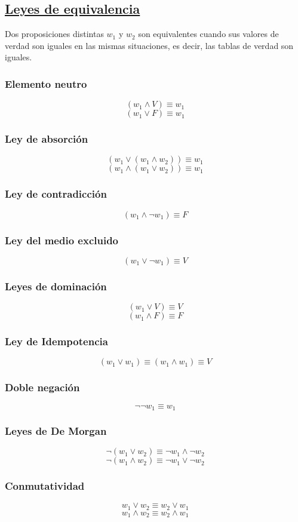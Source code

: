 \documentclass[10pt,a4paper,openright]{book}
\begin{document}
\subsection*{\underline{Leyes de equivalencia}}
Dos proposiciones distintas $w_1$ y $w_2$ son equivalentes cuando sus valores de verdad son iguales en las mismas situaciones, es decir, las tablas de verdad son iguales.

\begin{multicols}{2}
\subsubsection*{Elemento neutro}
$$(w_1 \wedge V) \equiv w_1$$
$$(w_1 \vee F) \equiv w_1$$
\subsubsection*{Ley de absorción}
$$(w_1 \vee (w_1 \wedge w_2 )) \equiv w_1$$
$$(w_1 \wedge (w_1 \vee w_2 )) \equiv w_1$$
\subsubsection*{Ley de contradicción}
$$(w_1 \wedge \neg w_1 ) \equiv F$$
\subsubsection*{Ley del medio excluido}
$$(w_1 \vee \neg w_1) \equiv V$$
\subsubsection*{Leyes de dominación}
$$(w_1 \vee V) \equiv V$$
$$(w_1 \wedge F) \equiv F$$  
\subsubsection*{Ley de Idempotencia}
$$(w_1 \vee w_1) \equiv (w_1 \wedge w_1) \equiv V$$
\subsubsection*{Doble negación}
$$\neg \neg w_1 \equiv w_1$$
\subsubsection*{Leyes de De Morgan}
$$\neg (w_1 \vee w_2) \equiv \neg w_1 \wedge \neg w_2$$
$$\neg (w_1 \wedge w_2) \equiv \neg w_1 \vee \neg w_2$$  
\subsubsection*{Conmutatividad}
$$w_1 \vee w_2 \equiv w_2 \vee w_1$$
$$w_1 \wedge w_2 \equiv w_2 \wedge w_1$$

\end{multicols}
\end{document}
